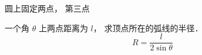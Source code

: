 
\begin{issues}
\issueDraft
\end{issues}

圆上固定两点， 第三点

一个角 $\theta$ 上两点距离为 $l$， 求顶点所在的弧线的半径．
\begin{equation}
R = \frac{l}{2\sin\theta}
\end{equation}
